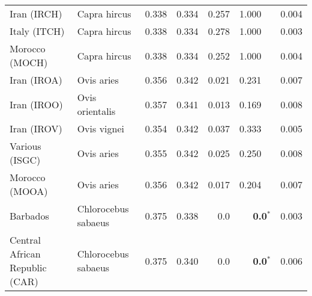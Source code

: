\begin{center}
\begin{adjustbox}{width = 1\textwidth}
\begin{tabular}{|l|l|r|r|r|r|r|}
                    Iran (IRCH) &         Capra hircus &                                              0.338 &                                              0.334 &            0.257 &                         1.000~~ &              0.004 \\
                   Italy (ITCH) &         Capra hircus &                                              0.338 &                                              0.334 &            0.278 &                         1.000~~ &              0.003 \\
                 Morocco (MOCH) &         Capra hircus &                                              0.338 &                                              0.334 &            0.252 &                         1.000~~ &              0.004 \\
                    Iran (IROA) &           Ovis aries &                                              0.356 &                                              0.342 &            0.021 &                         0.231~~ &              0.007 \\
                    Iran (IROO) &      Ovis orientalis &                                              0.357 &                                              0.341 &            0.013 &                         0.169~~ &              0.008 \\
                    Iran (IROV) &          Ovis vignei &                                              0.354 &                                              0.342 &            0.037 &                         0.333~~ &              0.005 \\
                 Various (ISGC) &           Ovis aries &                                              0.355 &                                              0.342 &            0.025 &                         0.250~~ &              0.008 \\
                 Morocco (MOOA) &           Ovis aries &                                              0.356 &                                              0.342 &            0.017 &                         0.204~~ &              0.007 \\
                       Barbados &  Chlorocebus sabaeus &                                              0.375 &                                              0.338 &              0.0 &                    \textbf{0.0}$\bm{^*}$ &              0.003 \\
 Central African Republic (CAR) &  Chlorocebus sabaeus &                                              0.375 &                                              0.340 &              0.0 &                    \textbf{0.0}$\bm{^*}$ &              0.006 \\

\end{tabular}
\end{adjustbox}
\end{center}
